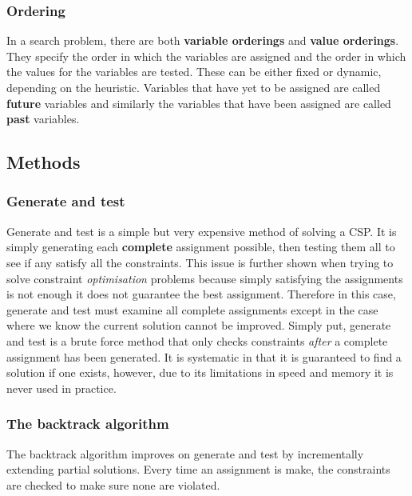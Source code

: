 \documentclass[CS4402-Notes.tex]{subfiles}
\begin{document}
\subsubsection{Ordering}
In a search problem, there are both \textbf{variable orderings} and \textbf{value orderings}. They specify the order in which the variables are assigned and the order in which the values for the variables are tested. These can be either fixed or dynamic, depending on the heuristic. 
\n
Variables that have yet to be assigned are called \textbf{future} variables and similarly the variables that have been assigned are called \textbf{past} variables. 

\subsection{Methods}
\subsubsection{Generate and test}
Generate and test is a simple but very expensive method of solving a CSP. It is simply generating each \textbf{complete} assignment possible, then testing them all to see if any satisfy all the constraints. 
\n
This issue is further shown when trying to solve constraint \textit{optimisation} problems because simply satisfying the assignments is not enough it does not guarantee the best assignment. Therefore in this case, generate and test must examine all complete assignments except in the case where we know the current solution cannot be improved. 
\n
Simply put, generate and test is a brute force method that only checks constraints \textit{after} a complete assignment has been generated. It is systematic in that it is guaranteed to find a solution if one exists, however, due to its limitations in speed and memory it is never used in practice. 

\subsubsection{The backtrack algorithm}
The backtrack algorithm improves on generate and test by incrementally extending partial solutions. Every time an assignment is make, the constraints are checked to make sure none are violated.
\end{document}
